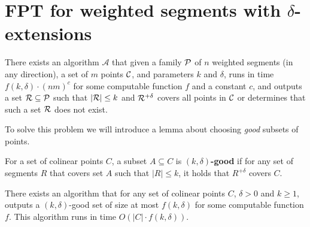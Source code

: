 \section{FPT for weighted segments with $\delta$-extensions}
\begin{tw}{
	\label{fpt_weighted_segment}
	There exists an algorithm $\mathcal{A}$ that given a family $\mathcal{P}$ of
	$n$ weighted segments (in any direction),
	a set of $m$ points $\mathcal{C}$, and parameters $k$ and $\delta$,
	runs in time $f(k, \delta) \cdot (nm)^c$ for some computable function $f$ and a constant $c$,
	and outputs a set $\mathcal{R} \subseteq \mathcal{P}$
	such that $|\mathcal{R}| \le k$ and $\mathcal{R}^{+\delta}$ covers all points in $\mathcal{C}$
	or determines that such a set $\mathcal{R}$ does not exist.
}\end{tw}


To solve this problem we will introduce a lemma about choosing
\textit{good} subsets of points.

\begin{defi}
	For a set of colinear points $C$,
	a subset $A \subseteq C$ is \textbf{$(k,\delta)$-good} 
	if for any set of segments $R$ that covers set $A$
	such that $|R| \le k$, it holds that $R^{+\delta}$ covers $C$.
\end{defi}

\begin{lemma}
	\label{good_set_exists}
	There exists an algorithm that
	for any set of colinear points $C$, $\delta > 0$ and $k \ge 1$,
	outputs a $(k,\delta)$-good set of size at most $f(k, \delta)$
	for some computable function $f$. This algorithm runs in time
	$O(|C| \cdot f(k, \delta))$.
\end{lemma}

